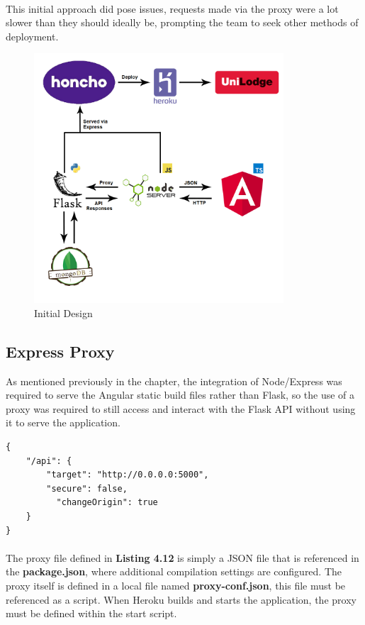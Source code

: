 \paragraph{}
This initial approach did pose issues, requests made via the proxy were a lot slower than they should ideally be, prompting the team to seek other methods of deployment.

\begin{figure}[H]
	\caption{Initial Design\newline}
	\label{image:design}
	\centering
	\includegraphics[width=0.83\textwidth]{images/design.png}
\end{figure}	

\subsection{Express Proxy}
As mentioned previously in the chapter, the integration of Node/Express was required to serve the Angular static build files rather than Flask, so the use of a proxy was required to still access and interact with the Flask API without using it to serve the application.
\newline

\begin{lstlisting}[caption=API Proxy]
{
    "/api": {
        "target": "http://0.0.0.0:5000",
        "secure": false, 
    	  "changeOrigin": true
    }
}
\end{lstlisting}

\paragraph{}
The proxy file defined in \textbf{Listing 4.12} is simply a JSON file that is referenced in the \textbf{package.json}, where additional compilation settings are configured. The proxy itself is defined in a local file named \textbf{proxy-conf.json}, this file must be referenced as a script. When Heroku builds and starts the application, the proxy must be defined within the start script. 

